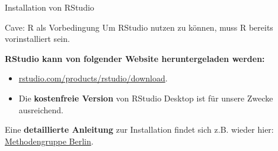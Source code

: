 \documentclass[11pt,ignorenonframetext,]{beamer}
\begin{document}
\begin{frame}{Installation von RStudio}
\begin{block}{Cave: R als Vorbedingung}
  Um RStudio nutzen zu können, muss R bereits vorinstalliert sein.
\end{block}

\textbf{RStudio kann von folgender Website heruntergeladen werden:}

\begin{itemize}
\item
  \href{https://www.rstudio.com/products/rstudio/download/}{rstudio.com/products/rstudio/download}.
\item
  Die \textbf{kostenfreie Version} von RStudio Desktop ist für unsere
  Zwecke ausreichend.
\end{itemize}

Eine \textbf{detaillierte Anleitung} zur Installation findet sich z.B.
wieder hier:
\href{http://methods-berlin.com/wp-content/uploads/Installation.html}{Methodengruppe Berlin}.
\end{frame}
\end{document}
